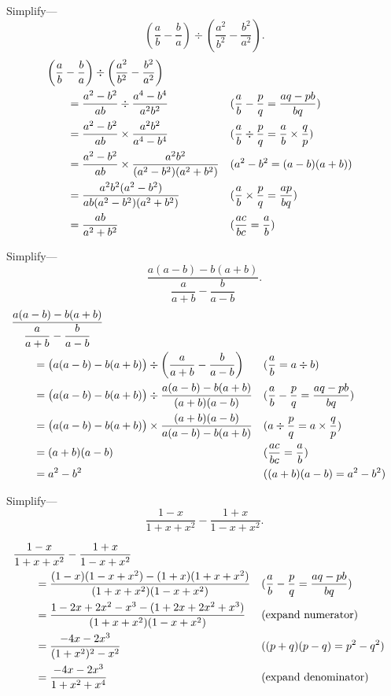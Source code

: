 \documentclass[DIN, pagenumber=false, fontsize=11pt, parskip=half]{scrartcl}
\begin{document}
\begin{problems}[from=1,step=1]
    \problem Simplify---
    \[
        \left(\frac{a}{b} - \frac{b}{a}\right) \div \left(\frac{a^2}{b^2} - \frac{b^2}{a^2}\right).
    \]
    \answer 
    \begin{align*}
        \MoveEqLeft
        \left(\frac{a}{b} - \frac{b}{a}\right) \div \left(\frac{a^2}{b^2} - \frac{b^2}{a^2}\right)\\ 
        &= \frac{a^2-b^2}{ab} \div \frac{a^4-b^4}{a^2b^2} && \text{($\frac{a}{b} - \frac{p}{q} = \frac{aq-pb}{bq}$)}\\ 
        &= \frac{a^2-b^2}{ab} \times \frac{a^2b^2}{a^4-b^4} && \text{($\frac{a}{b} \div \frac{p}{q} = \frac{a}{b} \times \frac{q}{p}$)}\\ 
        &= \frac{a^2-b^2}{ab} \times \frac{a^2b^2}{(a^2-b^2)(a^2+b^2)} && \text{($a^2-b^2 = (a-b)(a+b)$)}\\ 
        &= \frac{a^2b^2(a^2-b^2)}{ab(a^2-b^2)(a^2+b^2)} && \text{($\frac{a}{b} \times \frac{p}{q} = \frac{ap}{bq}$)}\\ 
        &= \frac{ab}{a^2+b^2} && \text{($\frac{ac}{bc} = \frac{a}{b}$)}
    \end{align*}

    \problem Simplify---
    \[
        \frac{a(a-b) - b(a+b)}{\dfrac{a}{a+b} - \dfrac{b}{a-b}}.
    \]
    \answer 
    \begin{align*}
        \MoveEqLeft
        \frac{a(a-b) - b(a+b)}{\dfrac{a}{a+b} - \dfrac{b}{a-b}}\\ 
        &= \big(a(a-b) - b(a+b)\big) \div \left(\frac{a}{a+b} - \frac{b}{a-b}\right) && \text{($\frac{a}{b} = a \div b$)}\\ 
        &= \big(a(a-b) - b(a+b)\big) \div \frac{a(a-b) - b(a+b)}{(a+b)(a-b)} && \text{($\frac{a}{b} - \frac{p}{q} = \frac{aq-pb}{bq}$)}\\ 
        &= \big(a(a-b) - b(a+b)\big) \times \frac{(a+b)(a-b)}{a(a-b) - b(a+b)} && \text{($a \div \frac{p}{q} = a \times \frac{q}{p}$)}\\ 
        &= (a+b)(a-b) && \text{($\frac{ac}{bc} = \frac{a}{b}$)}\\ 
        &= a^2-b^2 && \text{($(a+b)(a-b) = a^2-b^2$)}
    \end{align*}

    \problem Simplify---
    \[
        \frac{1-x}{1+x+x^2} - \frac{1+x}{1-x+x^2}.
    \]

    \answer 
    \begin{align*}
        \MoveEqLeft
        \frac{1-x}{1+x+x^2} - \frac{1+x}{1-x+x^2}\\ 
        &= \frac{(1-x)(1-x+x^2) - (1+x)(1+x+x^2)}{(1+x+x^2)(1-x+x^2)} && \text{($\frac{a}{b} - \frac{p}{q} = \frac{aq-pb}{bq}$)}\\ 
        &= \frac{1-2x+2x^2-x^3 - (1+2x+2x^2+x^3)}{(1+x+x^2)(1-x+x^2)} && \text{(expand numerator)}\\ 
        &= \frac{-4x-2x^3}{(1+x^2)^2-x^2} && \text{($(p+q)(p-q) = p^2-q^2$)}\\ 
        &= \frac{-4x-2x^3}{1+x^2+x^4} && \text{(expand denominator)}
    \end{align*}


\end{problems}
\end{document}
